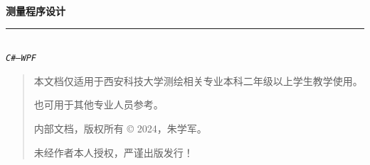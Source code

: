 

\thispagestyle{empty}

\noindent
\begin{minipage}
{\textwidth}
\raggedleft
{\Huge \bfseries 测量程序设计}
\noindent\rule[-1ex]{\textwidth}{6pt}\\[2.5ex]
\hfill\emph{\huge  \texttt{C\#--WPF}}
\end{minipage}

\noindent{}


\newpage\thispagestyle{empty}
\begin{quote}\footnotesize
    本文档仅适用于西安科技大学测绘相关专业本科二年级以上学生教学使用。

    也可用于其他专业人员参考。

    内部文档，版权所有 \copyright{}  2024，朱学军。

    未经作者本人授权，严谨出版发行！
\end{quote}